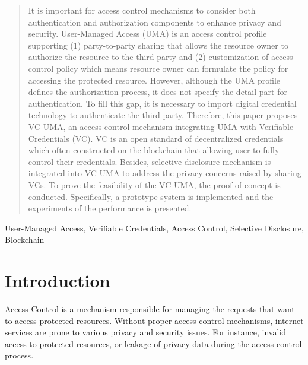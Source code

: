 \documentclass[conference]{IEEEtran}
\begin{document}
\begin{sloppypar}
\maketitle

\begin{abstract}
    It is important for access control mechanisms to consider both authentication and authorization components to enhance privacy and security. User-Managed Access (UMA) is an access control profile supporting (1) party-to-party sharing that allows the resource owner to authorize the resource to the third-party and (2) customization of access control policy which means resource owner can formulate the policy for accessing the protected resource. However, although the UMA profile defines the authorization process, it does not specify the detail part for authentication. To fill this gap, it is necessary to import digital credential technology to authenticate the third party. Therefore, this paper proposes VC-UMA, an access control mechanism integrating UMA with Verifiable Credentials (VC). VC is an open standard of decentralized credentials which often constructed on the blockchain that allowing user to fully control their credentials.  Besides, selective disclosure mechanism is integrated into VC-UMA to address the privacy concerns raised by sharing VCs. To prove the feasibility of the VC-UMA, the proof of concept is conducted. Specifically, a prototype system is implemented and the experiments of the performance is presented. 
\end{abstract}

\begin{IEEEkeywords}
    User-Managed Access, Verifiable Credentials, Access Control, Selective Disclosure, Blockchain
\end{IEEEkeywords}

\section{Introduction}

Access Control\cite{AccessControl1} is a mechanism responsible for managing the requests that want to access protected resources. Without proper access control mechanisms, internet services are prone to various privacy and security issues. For instance, invalid access to protected resources, or leakage of privacy data during the access control process.


\end{sloppypar}
\end{document}
